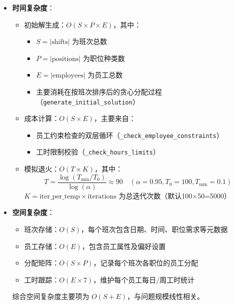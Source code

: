 \documentclass{ctexart}
\begin{document}
\begin{itemize}
    \item \textbf{时间复杂度}：
    \begin{itemize}
        \item 初始解生成：$O(S \times P \times E)$，其中：
        \begin{itemize}
            \item $S = |\text{shifts}|$ 为班次总数
            \item $P = |\text{positions}|$ 为职位种类数
            \item $E = |\text{employees}|$ 为员工总数
            \item 主要消耗在按班次排序后的贪心分配过程（\texttt{generate\_initial\_solution}）
        \end{itemize}
        
        \item 成本计算：$O(S \times E)$，主要来自：
        \begin{itemize}
            \item 员工约束检查的双层循环（\texttt{\_check\_employee\_constraints}）
            \item 工时限制校验（\texttt{\_check\_hours\_limits}）
        \end{itemize}
        
        \item 模拟退火：$O(T \times K)$，其中：
        \begin{equation}
            T = \frac{\log(T_{\min}/T_0)}{\log(\alpha)} \approx 90 \quad (\alpha=0.95, T_0=100, T_{\min}=0.1)
        \end{equation}
        $K = \text{iter\_per\_temp} \times \text{iterations}$ 为总迭代次数（默认100×50=5000）
    \end{itemize}

    \item \textbf{空间复杂度}：
    \begin{itemize}
        \item 班次存储：$O(S)$，每个班次包含日期、时间、职位需求等元数据
        \item 员工存储：$O(E)$，包含员工属性及偏好设置
        \item 分配矩阵：$O(S \times P)$，记录每个班次各职位的员工分配
        \item 工时跟踪：$O(E \times 7)$，维护每个员工每日/周工时统计
    \end{itemize}
    综合空间复杂度主要项为 $O(S + E)$，与问题规模线性相关。
\end{itemize}
\end{document}
